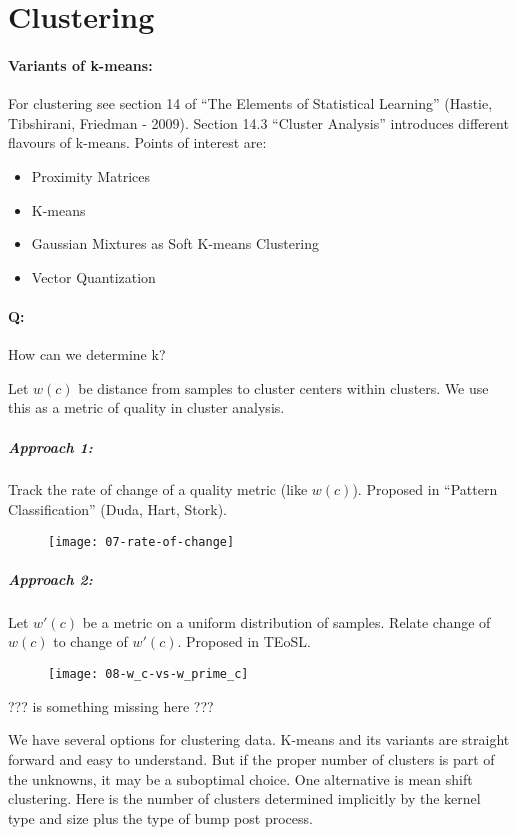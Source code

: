 
\section{Clustering}

\paragraph{Variants of k-means:}
For clustering see section 14 of ``The Elements of Statistical Learning'' (Hastie, Tibshirani, Friedman - 2009). Section 14.3 ``Cluster Analysis'' introduces different flavours of k-means. Points of interest are:
\begin{itemize}
	\item Proximity Matrices
	\item K-means
	\item Gaussian Mixtures as Soft K-means Clustering
	\item Vector Quantization
\end{itemize}

\paragraph{Q:} How can we determine k?

Let $w(c)$ be distance from samples to cluster centers within clusters. We use this as a metric of quality in cluster analysis.

\subparagraph{Approach 1:} Track the rate of change of a quality metric (like $w(c)$). Proposed in ``Pattern Classification'' (Duda, Hart, Stork).

\begin{figure}[H]
	\centering
	\texttt{[image: 07-rate-of-change]}
\end{figure}

\subparagraph{Approach 2:} Let $w'(c)$ be a metric on a uniform distribution of samples. Relate change of $w(c)$ to change of $w'(c)$. Proposed in TEoSL.

\begin{figure}[H]
	\centering
	\texttt{[image: 08-w\_c-vs-w\_prime\_c]}
\end{figure}

??? is something missing here ???

We have several options for clustering data. K-means and its variants are straight forward and easy to understand. But if the proper number of clusters is part of the unknowns, it may be a suboptimal choice.
One alternative is mean shift clustering. Here is the number of clusters determined implicitly by the kernel type and size plus the type of bump post process.

